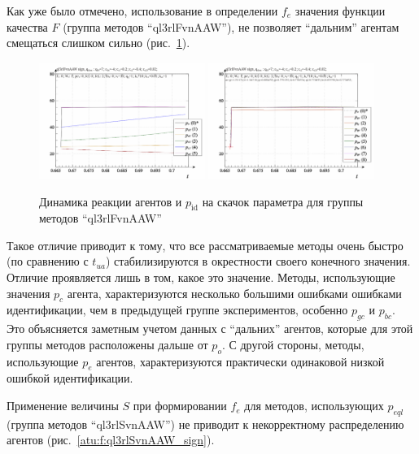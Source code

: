 Как уже было отмечено, использование в определении $f_e$
значения функции качества $F$ (группа методов ``ql3rlFvnAAW''),
не позволяет ``дальним'' агентам смещаться слишком сильно
(рис.~\ref{atu:f:ql3rlFvnAAW_sign}).

\begin{figure}[htb!]
  \centerline{
    \includegraphics[width=0.48\textwidth]{p/sign/qls-p_t_pi_m_ql3rlFvnAAW_sign.png}
    \hfill
    \includegraphics[width=0.48\textwidth]{p/sign/qls-p_t_p_m_ql3rlFvnAAW_sign.png}
  }
  \caption{Динамика реакции агентов и $p_\mathrm{id}$ на скачок параметра для группы методов ``ql3rlFvnAAW''}
  \label{atu:f:ql3rlFvnAAW_sign}
\end{figure}

Такое отличие приводит к тому, что все рассматриваемые методы
очень быстро (по сравнению с $t_{ua}$) стабилизируются
в окрестности своего конечного значения. Отличие проявляется лишь в том,
какое это значение. Методы, использующие значения $p_c$ агента,
характеризуются несколько большими ошибками ошибками идентификации,
чем в предыдущей группе экспериментов, особенно $p_{gc}$ и $p_{bc}$.
Это объясняется заметным учетом данных с ``дальних'' агентов,
которые для этой группы методов расположены дальше от $p_o$.
С другой стороны, методы, использующие $p_e$ агентов,
характеризуются практически одинаковой низкой ошибкой идентификации.


Применение величины $S$ при формировании $f_e$ для методов,
использующих $p_{eql}$ (группа методов ``ql3rlSvnAAW'') не приводит к
некорректному распределению агентов
(рис.~\ref{atu:f:ql3rlSvnAAW_sign}).


